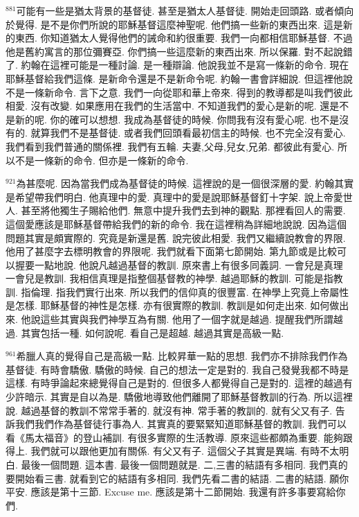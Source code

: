 \documentclass{book}
\begin{document}
$^{881}$可能有一些是猶太背景的基督徒.
甚至是猶太人基督徒.
開始走回頭路.
或者傾向於覺得.
是不是你們所說的耶穌基督這麼神聖呢.
他們搞一些新的東西出來.
這是新的東西.
你知道猶太人覺得他們的誡命和約很重要.
我們一向都相信耶穌基督.
不過他是舊約寓言的那位彌賽亞.
你們搞一些這麼新的東西出來.
所以保羅.
對不起說錯了.
約翰在這裡可能是一種討論.
是一種辯論.
他說我並不是寫一條新的命令.
現在耶穌基督給我們這條.
是新命令還是不是新命令呢.
約翰一書會詳細說.
但這裡他說不是一條新命令.
言下之意.
我們一向從耶和華上帝來.
得到的教導都是叫我們彼此相愛.
沒有改變.
如果應用在我們的生活當中.
不知道我們的愛心是新的呢.
還是不是新的呢.
你的確可以想想.
我成為基督徒的時候.
你問我有沒有愛心呢.
也不是沒有的.
就算我們不是基督徒.
或者我們回頭看最初信主的時候.
也不完全沒有愛心.
我們看到我們普通的關係裡.
我們有五輪.
夫妻,父母,兒女,兄弟.
都彼此有愛心.
所以不是一條新的命令.
但亦是一條新的命令.

$^{921}$為甚麼呢.
因為當我們成為基督徒的時候.
這裡說的是一個很深層的愛.
約翰其實是希望帶我們明白.
他真理中的愛.
真理中的愛是說耶穌基督釘十字架.
說上帝愛世人.
甚至將他獨生子賜給他們.
無意中提升我們去到神的觀點.
那裡看回人的需要.
這個愛應該是耶穌基督帶給我們的新的命令.
我在這裡稍為詳細地說說.
因為這個問題其實是頗實際的.
究竟是新還是舊.
說完彼此相愛.
我們又繼續說教會的界限.
他用了甚麼字去標明教會的界限呢.
我們就看下面第七節開始.
第九節或是比較可以握要一點地說.
他說凡越過基督的教訓.
原來書上有很多同義詞.
一會兒是真理 一會兒是教訓.
我相信真理是指整個基督教的神學.
越過耶穌的教訓.
可能是指教訓.
指倫理.
指我們實行出來.
所以我們的信仰真的很豐富.
在神學上究竟上帝屬性是怎樣.
耶穌基督的神性是怎樣.
亦有很實際的教訓.
教訓是如何走出來.
如何做出來.
他說這些其實與我們神學互為有關.
他用了一個字就是越過.
提醒我們所謂越過.
其實包括一種.
如何說呢.
看自己是超越.
越過其實是高級一點.

$^{961}$希臘人真的覺得自己是高級一點.
比較昇華一點的思想.
我們亦不排除我們作為基督徒.
有時會驕傲.
驕傲的時候.
自己的想法一定是對的.
我自己發覺我都不時是這樣.
有時爭論起來總覺得自己是對的.
但很多人都覺得自己是對的.
這裡的越過有少許暗示.
其實是自以為是.
驕傲地導致他們離開了耶穌基督教訓的行為.
所以這裡說.
越過基督的教訓不常常手著的.
就沒有神.
常手著的教訓的.
就有父又有子.
告訴我們我們作為基督徒行事為人.
其實真的要緊緊知道耶穌基督的教訓.
我們可以看《馬太福音》的登山補訓.
有很多實際的生活教導.
原來這些都頗為重要.
能夠跟得上.
我們就可以跟他更加有關係.
有父又有子.
這個父子其實是異端.
有時不太明白.
最後一個問題.
這本書.
最後一個問題就是.
二,三書的結語有多相同.
我們真的要開始看三書.
就看到它的結語有多相同.
我們先看二書的結語.
二書的結語.
願你平安.
應該是第十三節.
Excuse me.
應該是第十二節開始.
我還有許多事要寫給你們.
\end{document}
